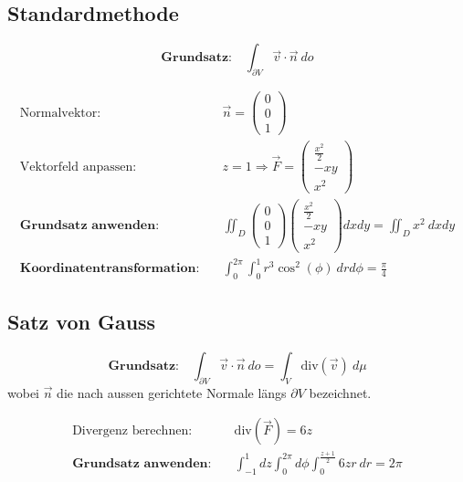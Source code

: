 \documentclass[11pt]{article}
\begin{document}
\clearpage

\subsection{Standardmethode}

\begin{equation*}
	\textbf{Grundsatz:}\quad\int_{\partial V} \vec{v}\cdot\vec{n}\ do
\end{equation*}

\begin{equation*}
\begin{split}
	\text{Normalvektor:}\quad & \vec{n} = \begin{pmatrix}
		0 \\ 0 \\ 1
	\end{pmatrix} \\
	\text{Vektorfeld anpassen:}\quad & z = 1 \Rightarrow \vec{F} = \begin{pmatrix}
		\frac{x^2}{2} \\ -xy \\ x^2
	\end{pmatrix} \\
	\textbf{Grundsatz anwenden:}\quad & \iint_D \begin{pmatrix}
		0 \\ 0 \\ 1
	\end{pmatrix}\begin{pmatrix}
		\frac{x^2}{2} \\ -xy \\ x^2
	\end{pmatrix} dxdy = \iint_D x^2\ dxdy \\
	\textbf{Koordinatentransformation:}\quad & \int_0^{2\pi} \int_0^1 r^3\cos^2(\phi)\ drd\phi = \frac{\pi}{4}
\end{split}
\end{equation*}

\subsection{Satz von Gauss}

\begin{equation*}
	\textbf{Grundsatz:}\quad\int_{\partial V} \vec{v}\cdot\vec{n}\ do = \int_V \text{div}(\vec{v})\ d\mu
\end{equation*}
wobei $\vec{n}$ die nach aussen gerichtete Normale l{\"a}ngs $\partial V$ bezeichnet.

\begin{equation*}
\begin{split}
	\text{Divergenz berechnen:}\quad & \text{div}(\vec{F}) = 6z \\
	\textbf{Grundsatz anwenden:}\quad & \int_{-1}^1 dz \int_0^{2\pi} d\phi \int_0^{\frac{z+1}{2}} 6zr\ dr = 2\pi
\end{split}
\end{equation*}
\end{document}

